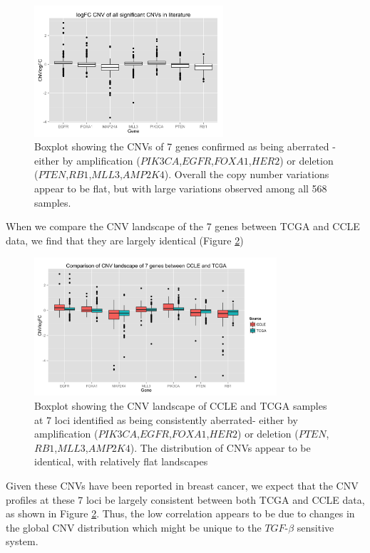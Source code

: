 \documentclass[a4paper,12pt]{article}
\begin{document}
\begin{figure}[t]
\centering
\includegraphics[width=7cm]{CNVreported.png}
\caption[Boxplot showing CNVs of 7 genes in TCGA identified as being
aberrated]{Boxplot showing the CNVs of 7 genes confirmed as being
  aberrated - either by amplification
  ($\textit{PIK3CA}$,$\textit{EGFR}$,$\textit{FOXA1}$,$\textit{HER2}$)
  or deletion
  ($\textit{PTEN}$,$\textit{RB1}$,$\textit{MLL3}$,$\textit{AMP2K4}$). Overall
  the copy number variations appear to be flat, but with large
  variations observed among all 568 samples.}
\label{cnvlandscape}
\end{figure}
When we compare the CNV landscape of the 7 genes between TCGA and CCLE
data, we find that they are largely identical (Figure \ref{cnvcompare})
\begin{figure}[h]
\centering
\includegraphics[width=9cm]{CNVcomparison.png}
\caption[Boxplot comparing CNV landscape of CCLE and TCGA data at 7
gene loci]{Boxplot showing the CNV landscape of CCLE and TCGA samples
  at 7 loci identified as being consistently aberrated- either by amplification
  ($\textit{PIK3CA}$,$\textit{EGFR}$,$\textit{FOXA1}$,$\textit{HER2}$)
  or deletion
  ($\textit{PTEN}$,$\textit{RB1}$,$\textit{MLL3}$,$\textit{AMP2K4}$). The
distribution of CNVs appear to be identical, with relatively flat landscapes}
\label{cnvcompare}
\end{figure}
Given these CNVs have been reported in breast cancer, we expect that
the CNV profiles at these 7 loci be largely consistent between both
TCGA and CCLE data, as shown in Figure \ref{cnvcompare}. Thus, the low
correlation appears to be due to changes in the global CNV
distribution which might be unique to the $\textit{TGF}$-$\beta$
sensitive system.
\end{document}
